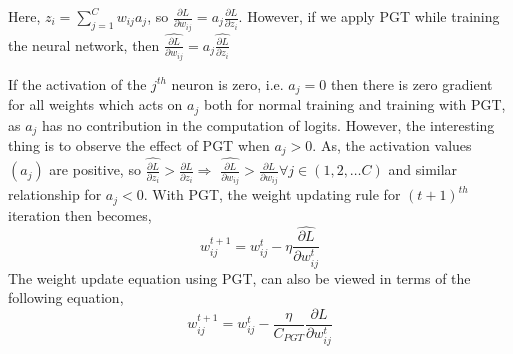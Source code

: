 \documentclass[times,sort&compress]{elsarticle}
\begin{document}
Here, $z_i = \sum_{j=1}^{C}w_{ij}a_j$, so $\frac{\partial L}{\partial w_{ij}} =
a_j\frac{\partial L}{\partial z_{i}} $. However, if we apply PGT while training the
neural network, then $\widehat{\frac{\partial L}{\partial w_{ij}}}
=a_j\widehat{\frac{\partial L}{\partial z_i}}$

If the activation of the $j^{th}$ neuron is zero, i.e. $a_j = 0$ then there is zero
gradient for all weights which acts on $a_j$ both for normal training and training with
PGT, as $a_j$ has no contribution in the computation of logits. However, the interesting
thing is to observe the effect of PGT when $a_j > 0$. As, the activation values $(a_j)$
are positive, so $ \widehat{\frac{\partial L}{\partial z_i}}  > \frac{\partial
L}{\partial z_{i}} \Rightarrow$ $\widehat{\frac{\partial L}{\partial w_{ij}}} >
\frac{\partial L}{\partial w_{ij}} \forall j \in (1,2,\ldots C)$ and similar
relationship for $a_j < 0$. With PGT, the weight updating rule for $(t+1)^{th}$
iteration then becomes,
\begin{equation}
\label{weight_update_PGT}
w_{ij}^{t+1} = w_{ij}^{t} - \eta \widehat{\frac{\partial L}{\partial w_{ij}^{t}}}
\end{equation}
The weight update equation using PGT, can also be viewed in terms of the following
equation,
\begin{equation}
\label{weight_update_final_PGT}
w_{ij}^{t+1} = w_{ij}^{t} - \frac{\eta}{C_{PGT}} \frac{\partial L}{\partial w_{ij}^{t}}
\end{equation}
\end{document}
